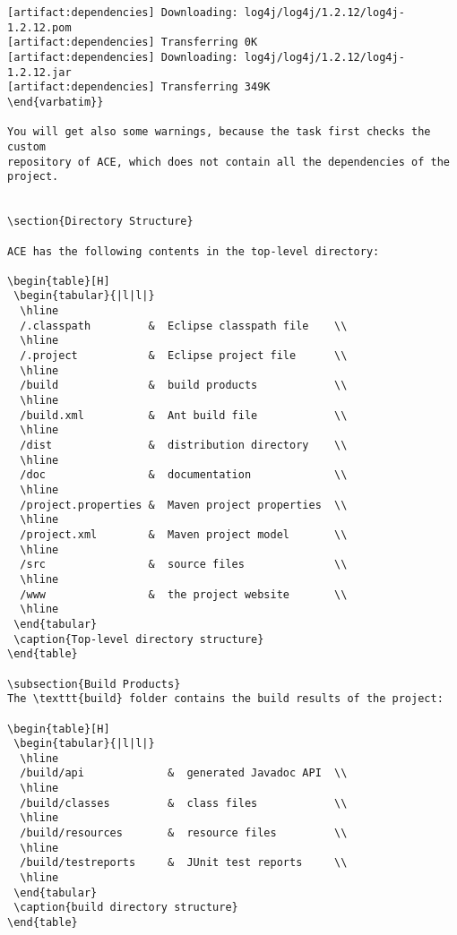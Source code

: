 \documentclass[11pt,a4paper]{article}
\begin{document}
\small{\begin{verbatim}
[artifact:dependencies] Downloading: log4j/log4j/1.2.12/log4j-1.2.12.pom
[artifact:dependencies] Transferring 0K
[artifact:dependencies] Downloading: log4j/log4j/1.2.12/log4j-1.2.12.jar
[artifact:dependencies] Transferring 349K
\end{varbatim}}

You will get also some warnings, because the task first checks the custom
repository of ACE, which does not contain all the dependencies of the project.


\section{Directory Structure}

ACE has the following contents in the top-level directory:

\begin{table}[H]
 \begin{tabular}{|l|l|}
  \hline
  /.classpath         &  Eclipse classpath file    \\
  \hline
  /.project           &  Eclipse project file      \\
  \hline
  /build              &  build products            \\
  \hline
  /build.xml          &  Ant build file            \\
  \hline
  /dist               &  distribution directory    \\
  \hline
  /doc                &  documentation             \\
  \hline
  /project.properties &  Maven project properties  \\
  \hline
  /project.xml        &  Maven project model       \\
  \hline
  /src                &  source files              \\
  \hline
  /www                &  the project website       \\
  \hline
 \end{tabular}
 \caption{Top-level directory structure}
\end{table}

\subsection{Build Products}
The \texttt{build} folder contains the build results of the project:

\begin{table}[H]
 \begin{tabular}{|l|l|}
  \hline
  /build/api             &  generated Javadoc API  \\
  \hline
  /build/classes         &  class files            \\
  \hline
  /build/resources       &  resource files         \\
  \hline
  /build/testreports     &  JUnit test reports     \\
  \hline
 \end{tabular}
 \caption{build directory structure}
\end{table}


\end{verbatim}}
\end{document}
